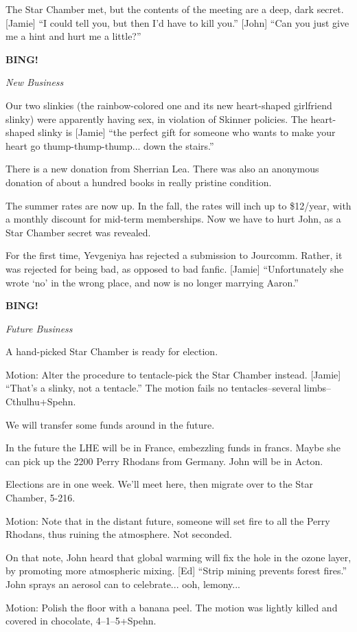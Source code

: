 \documentclass[12pt]{article}
\newcommand{\bing}{{\bf BING!} }
\newcommand{\goto}[1]{\bing \vskip 12pt \centerline{{\em{#1}}}}
\begin{document}
The Star Chamber met, but the contents of the meeting are a deep,
dark secret.  [Jamie] ``I could tell you, but then I'd have to kill
you.''  [John] ``Can you just give me a hint and hurt me a little?''

\goto{New Business}

Our two slinkies (the rainbow-colored one and its new heart-shaped
girlfriend slinky) were apparently having sex, in violation of
Skinner policies.  The heart-shaped slinky is [Jamie] ``the perfect
gift for someone who wants to make your heart go thump-thump-thump...
down the stairs.''

There is a new donation from Sherrian Lea.  There was also an
anonymous donation of about a hundred books in really pristine
condition.

The summer rates are now up.  In the fall, the rates will inch up
to \$12/year, with a monthly discount for mid-term memberships.
Now we have to hurt John, as a Star Chamber secret was revealed.

For the first time, Yevgeniya has rejected a submission to Jourcomm.
Rather, it was rejected for being bad, as opposed to bad fanfic.
[Jamie] ``Unfortunately she wrote `no' in the wrong place, and now
is no longer marrying Aaron.''

\goto{Future Business}

A hand-picked Star Chamber is ready for election.

Motion: Alter the procedure to tentacle-pick the Star Chamber instead.
[Jamie] ``That's a slinky, not a tentacle.''  The motion fails
no tentacles--several limbs--Cthulhu+Spehn.

We will transfer some funds around in the future.

In the future the LHE will be in France, embezzling funds in francs.
Maybe she can pick up the 2200 Perry Rhodans from Germany.  John
will be in Acton.

Elections are in one week.  We'll meet here, then migrate over to
the Star Chamber, 5-216.

Motion: Note that in the distant future, someone will set fire to
all the Perry Rhodans, thus ruining the atmosphere.  Not seconded.

On that note, John heard that global warming will fix the hole in
the ozone layer, by promoting more atmospheric mixing.  [Ed] ``Strip
mining prevents forest fires.''  John sprays an aerosol can to
celebrate... ooh, lemony...

Motion: Polish the floor with a banana peel.  The motion was lightly
killed and covered in chocolate, 4--1--5+Spehn.
\end{document}
